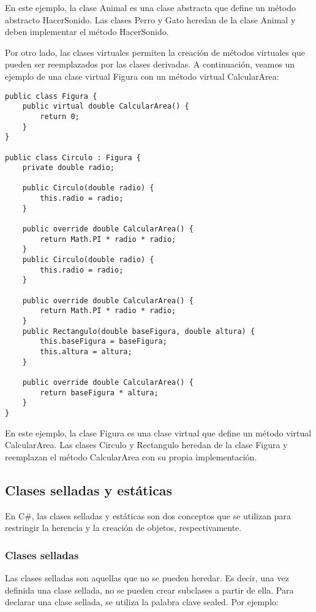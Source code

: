\documentclass[executivepaper]{article}
\begin{document}
En este ejemplo, la clase Animal es una clase abstracta que define un método abstracto HacerSonido. Las clases Perro y Gato heredan de la clase Animal y deben implementar el método HacerSonido.

Por otro lado, las clases virtuales permiten la creación de métodos virtuales que pueden ser reemplazados por las clases derivadas. A continuación, veamos un ejemplo de una clase virtual Figura con un método virtual CalcularArea:

\begin{lstlisting}
public class Figura {
    public virtual double CalcularArea() {
        return 0;
    }
}

public class Circulo : Figura {
    private double radio;

    public Circulo(double radio) {
        this.radio = radio;
    }

    public override double CalcularArea() {
        return Math.PI * radio * radio;
    }
    public Circulo(double radio) {
        this.radio = radio;
    }

    public override double CalcularArea() {
        return Math.PI * radio * radio;
    }
    public Rectangulo(double baseFigura, double altura) {
        this.baseFigura = baseFigura;
        this.altura = altura;
    }

    public override double CalcularArea() {
        return baseFigura * altura;
    }
}
\end{lstlisting}

En este ejemplo, la clase Figura es una clase virtual que define un método virtual CalcularArea. Las clases Circulo y Rectangulo heredan de la clase Figura y reemplazan el método CalcularArea con su propia implementación.

\subsection{Clases selladas y estáticas}

En C\#, las clases selladas y estáticas son dos conceptos que se utilizan para restringir la herencia y la creación de objetos, respectivamente.

\subsubsection{Clases selladas}

Las clases selladas son aquellas que no se pueden heredar. Es decir, una vez definida una clase sellada, no se pueden crear subclases a partir de ella. Para declarar una clase sellada, se utiliza la palabra clave sealed. Por ejemplo:
\end{document}
